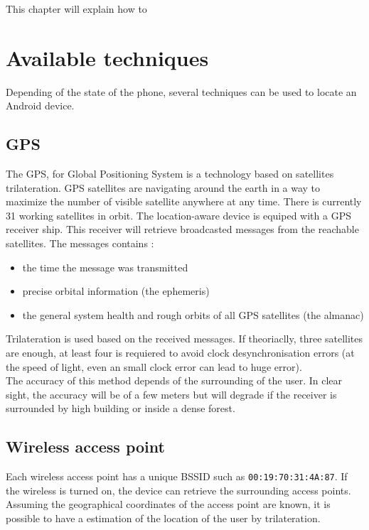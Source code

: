 \documentclass{report}
\begin{document}
This chapter will explain how to 

\section{Available techniques}
Depending of the state of the phone, several techniques can be used to locate an Android device.

\subsection{GPS}
The GPS, for Global Positioning System is a technology based on satellites trilateration. GPS satellites are navigating around the earth in a way to maximize the number of visible satellite anywhere at any time. There is currently 31 working satellites in orbit.
The location-aware device is equiped with a GPS receiver ship. This receiver will retrieve broadcasted messages from the reachable satellites. The messages contains :
\begin{itemize}
\item the time the message was transmitted
\item precise orbital information (the ephemeris)
\item the general system health and rough orbits of all GPS satellites (the almanac)
\end{itemize}

Trilateration is used based on the received messages. If theoriaclly, three satellites are enough, at least four is requiered to avoid clock desynchronisation errors (at the speed of light, even an small clock error can lead to huge error).\\

The accuracy of this method depends of the surrounding of the user. In clear sight, the accuracy will be of a few meters but will degrade if the receiver is surrounded by high building or inside a dense forest.

\subsection{Wireless access point}
Each wireless access point has a unique BSSID such as \texttt{00:19:70:31:4A:87}. If the wireless is turned on, the device can retrieve the surrounding access points. Assuming the geographical coordinates of the access point are known, it is possible to have a estimation of the location of the user by trilateration.\\
\end{document}

